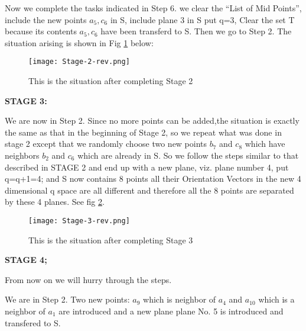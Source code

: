 \documentclass[english]{article}
\begin{document}
Now we complete the tasks indicated in Step 6. we clear the ``List
of Mid Points'', include the new points $a_{5},c_{6}$ in S, include
plane 3 in S put q=3, Clear the set T because its contents $a_{5},c_{6}$
have been transferd to S. Then we go to Step 2. The situation arising
is shown in Fig \ref{fig:fig-d} below: 

\begin{figure}[htp]
 \begin{center}
 
\texttt{[image: Stage-2-rev.png]}
\caption{This is the situation after completing  Stage 2}

\label{fig:fig-d} \end{center}
\end{figure} 


\medskip{}


\medskip{}


\textbf{STAGE 3: }

We are now in Step 2. Since no more points can be added,the situation
is exactly the same as that in the beginning of Stage 2, so we repeat
what was done in stage 2 except that we randomly choose two new points
$b_{7}$ and $c_{8}$ which have neighbors $b_{2}$ and $c_{6}$ which
are already in S. So we follow the steps similar to that described
in STAGE 2 and end up with a new plane, viz. plane number 4, put q=q+1=4; and S
now contains 8 points all their Orientation Vectors in the new 4 dimensional
q space are all different and therefore all the 8 points are separated
by these 4 planes. See fig \ref{fig:fig-e}.

\begin{figure}[htp]
 \begin{center}
 
\texttt{[image: Stage-3-rev.png]}
\caption{This is the situation after completing  Stage 3}

\label{fig:fig-e} \end{center}
\end{figure} 





\medskip{}
\medskip{}


\textbf{STAGE 4;}

From now on we will hurry through the steps.

We are in Step 2. Two new points: $a_{9}$ which is neighbor of $a_{4}$ and
$a_{10}$ which is a neighbor of $a_{1}$ are introduced and a new
plane plane No. 5 is introduced and transfered to S.
\end{document}
